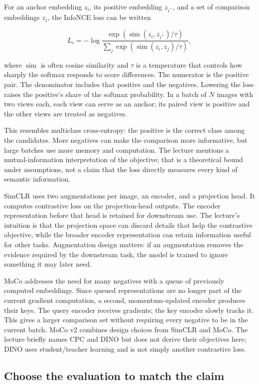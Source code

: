 For an anchor embedding \(z_i\), its positive embedding \(z_{i^+}\), and a set of comparison embeddings \(z_j\), the InfoNCE loss can be written

\[
L_i=-\log\frac{\exp(\operatorname{sim}(z_i,z_{i^+})/\tau)}
{\sum_j\exp(\operatorname{sim}(z_i,z_j)/\tau)},
\]

where \(\operatorname{sim}\) is often cosine similarity and \(\tau\) is a temperature that controls how sharply the softmax responds to score differences. The numerator is the positive pair. The denominator includes that positive and the negatives. Lowering the loss raises the positive's share of the softmax probability. In a batch of \(N\) images with two views each, each view can serve as an anchor; its paired view is positive and the other views are treated as negatives.

This resembles multiclass cross-entropy: the positive is the correct class among the candidates. More negatives can make the comparison more informative, but large batches use more memory and computation. The lecture mentions a mutual-information interpretation of the objective; that is a theoretical bound under assumptions, not a claim that the loss directly measures every kind of semantic information.

SimCLR uses two augmentations per image, an encoder, and a projection head. It computes contrastive loss on the projection-head outputs. The encoder representation before that head is retained for downstream use. The lecture's intuition is that the projection space can discard details that help the contrastive objective, while the broader encoder representation can retain information useful for other tasks. Augmentation design matters: if an augmentation removes the evidence required by the downstream task, the model is trained to ignore something it may later need.

MoCo addresses the need for many negatives with a queue of previously computed embeddings. Since queued representations are no longer part of the current gradient computation, a second, momentum-updated encoder produces their keys. The query encoder receives gradients; the key encoder slowly tracks it. This gives a larger comparison set without requiring every negative to be in the current batch. MoCo v2 combines design choices from SimCLR and MoCo. The lecture briefly names CPC and DINO but does not derive their objectives here; DINO uses student/teacher learning and is not simply another contrastive loss.

\subsection{Choose the evaluation to match the claim}\label{04-visual-computing-ii-ch031-choose-the-evaluation-to-match-the-claim}

